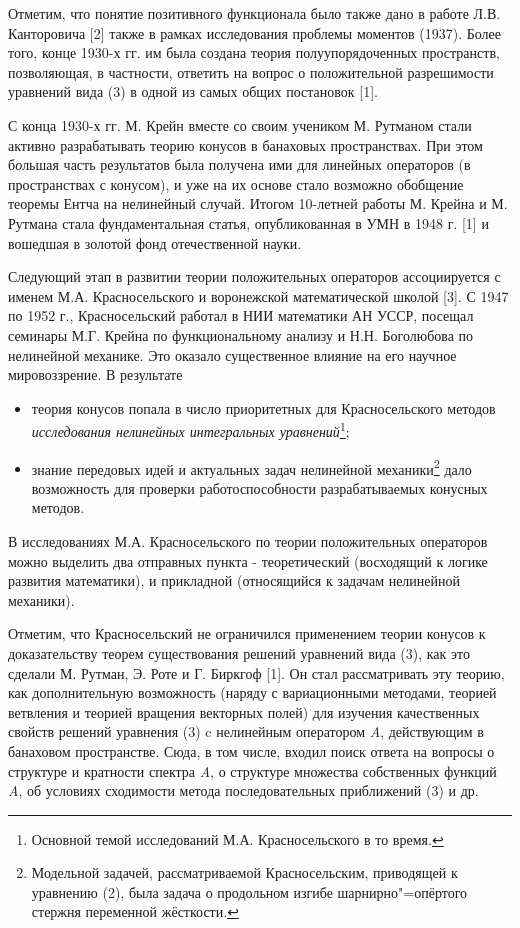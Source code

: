 Отметим, что понятие позитивного функционала было также дано в работе Л.В. Канторовича [2] также в рамках исследования проблемы моментов (1937). Более того, конце 1930-х гг. им была создана теория полуупорядоченных пространств, позволяющая, в частности, ответить на вопрос о положительной разрешимости уравнений вида (3) в одной из самых общих постановок [1].

С конца 1930-х гг. М. Крейн вместе со своим учеником М. Рутманом стали активно разрабатывать теорию конусов в банаховых пространствах. При этом б\textit{о}льшая часть результатов была получена ими для линейных операторов (в пространствах с конусом), и уже на их основе стало возможно обобщение теоремы Ентча на нелинейный случай. Итогом 10-летней работы М. Крейна и М. Рутмана стала фундаментальная статья, опубликованная в УМН в 1948 г. [1] и вошедшая в золотой фонд отечественной науки.

Следующий этап в развитии теории положительных операторов ассоциируется с именем М.А. Красносельского и воронежской математической школой [3]. С 1947 по 1952 г., Красносельский работал в НИИ математики АН УССР, посещал семинары М.Г. Крейна по функциональному анализу и Н.Н. Боголюбова по нелинейной механике. Это оказало существенное влияние на его научное мировоззрение. В результате
\begin{itemize}
	\item теория конусов попала в число приоритетных для Красносельского методов \textit{исследования нелинейных интегральных уравнений}\footnote{Основной темой  исследований М.А. Красносельского в то время.};
		\item знание передовых идей и актуальных задач нелинейной механики\footnote{Модельной задачей, рассматриваемой Красносельским, приводящей к уравнению (2), была задача о продольном изгибе шарнирно"=опёртого стержня переменной жёсткости.} дало возможность для проверки работоспособности разрабатываемых конусных методов.
	\end{itemize}
В исследованиях М.А. Красносельского по теории положительных операторов можно выделить два отправных пункта - теоретический (восходящий к логике развития математики), и прикладной (относящийся к задачам нелинейной механики).
	
	Отметим, что Красносельский не ограничился применением теории конусов к доказательству теорем существования решений уравнений вида (3), как это сделали М. Рутман, Э. Роте и Г. Биркгоф [1]. Он стал рассматривать эту теорию, как дополнительную возможность (наряду с вариационными методами, теорией ветвления и теорией вращения векторных полей) для изучения качественных свойств решений уравнения (3) c нелинейным оператором \textit{A}, действующим в банаховом пространстве. Сюда, в том числе, входил поиск ответа на вопросы о структуре и кратности спектра \textit{A}, о структуре множества собственных функций \textit{A}, об условиях сходимости метода последовательных приближений (3) и др.
	
